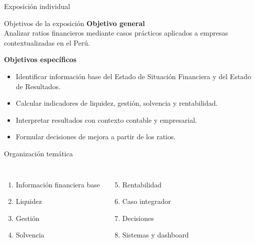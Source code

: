 \begin{frame}
  \titlepage
  \vspace{-0.5em}
  \centering\small Exposición individual
\end{frame}

\begin{frame}{Objetivos de la exposición}
\textbf{Objetivo general}\\
Analizar ratios financieros mediante casos prácticos aplicados a empresas contextualizadas en el Perú.

\vspace{0.6em}
\textbf{Objetivos específicos}
\begin{itemize}
  \item Identificar información base del Estado de Situación Financiera y del Estado de Resultados.
  \item Calcular indicadores de liquidez, gestión, solvencia y rentabilidad.
  \item Interpretar resultados con contexto contable y empresarial.
  \item Formular decisiones de mejora a partir de los ratios.
\end{itemize}
\end{frame}

\begin{frame}{Organización temática}
\begin{columns}[T]
\begin{enumerate}
  \item Información financiera base
  \item Liquidez
  \item Gestión
  \item Solvencia
\end{enumerate}
\begin{enumerate}
  \setcounter{enumi}{4}
  \item Rentabilidad
  \item Caso integrador
  \item Decisiones
  \item Sistemas y dashboard
\end{enumerate}
\end{columns}
\end{frame}
